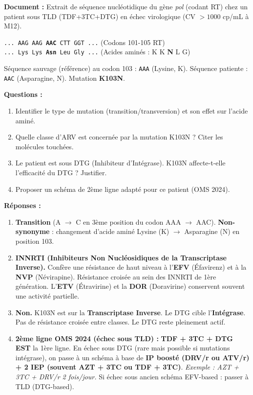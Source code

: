 \documentclass[11pt]{article}
\begin{document}
\begin{exemplebox}
\textbf{Document :} Extrait de séquence nucléotidique du gène \textit{pol} (codant RT) chez un patient sous TLD (TDF+3TC+DTG) en échec virologique (CV $> 1000$ cp/mL à M12).
\begin{center}
\texttt{... AAG AAG \textbf{AAC} CTT GGT ...} \quad (Codons 101-105 RT) \\
\texttt{... Lys Lys \textbf{Asn} Leu Gly ...} \quad (Acides aminés : K K \textbf{N} L G)
\end{center}
Séquence sauvage (référence) au codon 103 : \texttt{AAA} (Lysine, K). Séquence patiente : \texttt{AAC} (Asparagine, N). Mutation \textbf{K103N}.

\textbf{Questions :}
\begin{enumerate}
\item Identifier le type de mutation (transition/transversion) et son effet sur l'acide aminé.
\item Quelle classe d'ARV est concernée par la mutation K103N ? Citer les molécules touchées.
\item Le patient est sous DTG (Inhibiteur d'Intégrase). K103N affecte-t-elle l'efficacité du DTG ? Justifier.
\item Proposer un schéma de 2ème ligne adapté pour ce patient (OMS 2024).
\end{enumerate}

\textbf{Réponses :}
\begin{enumerate}
\item \textbf{Transition} (A $\to$ C en 3ème position du codon AAA $\to$ AAC). \textbf{Non-synonyme} : changement d'acide aminé Lysine (K) $\to$ Asparagine (N) en position 103.
\item \textbf{INNRTI (Inhibiteurs Non Nucléosidiques de la Transcriptase Inverse).} Confère une résistance de haut niveau à l'\textbf{EFV} (Éfavirenz) et à la \textbf{NVP} (Névirapine). Résistance croisée au sein des INNRTI de 1ère génération. L'\textbf{ETV} (Étravirine) et la \textbf{DOR} (Doravirine) conservent souvent une activité partielle.
\item \textbf{Non.} K103N est sur la \textbf{Transcriptase Inverse}. Le DTG cible l'\textbf{Intégrase}. Pas de résistance croisée entre classes. Le DTG reste pleinement actif.
\item \textbf{2ème ligne OMS 2024 (échec sous TLD) :} \textbf{TDF + 3TC + DTG} \textbf{EST} la 1ère ligne. En échec sous DTG (rare mais possible si mutations intégrase), on passe à un schéma à base de \textbf{IP boosté (DRV/r ou ATV/r) + 2 IEP (souvent AZT + 3TC ou TDF + 3TC)}. \textit{Exemple : AZT + 3TC + DRV/r 2 fois/jour.} Si échec sous ancien schéma EFV-based : passer à TLD (DTG-based).
\end{enumerate}
\end{exemplebox}
\end{document}
